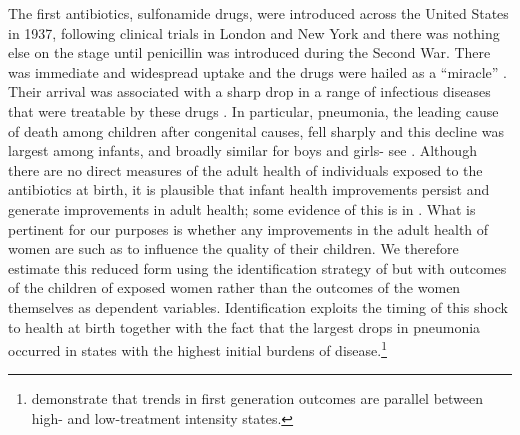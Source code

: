 \documentclass[subeqn]{article}
\begin{document}
\begin{spacing}{1.4}
The first antibiotics, sulfonamide drugs, were introduced across the United States in 1937, following clinical trials in London and New York and there was nothing else on the stage until penicillin was introduced during the Second War. There was immediate and widespread uptake and the drugs were hailed as a ``miracle'' \citep{Lesch2006}. Their arrival was associated with a sharp drop in a range of infectious diseases that were treatable by these drugs \citep{Jayachandranetal2010}. In particular, pneumonia, the leading cause of death among children after congenital causes, fell sharply and this decline was largest among infants, and broadly similar for boys and girls- see \citep{BhalotraVenkataramani2014}. Although there are no direct measures of the adult health of individuals exposed to the antibiotics at birth, it is plausible that infant health improvements persist and generate improvements in adult health; some evidence of this is in \citep{Almondetal2011b,ButikoferSalvanes2015,Hjortetal2016,Bhalotraetal2015}. What is pertinent for our purposes is whether any improvements in the adult health of women are such as to influence the quality of their children. We therefore estimate this reduced form using the identification strategy of \citep{BhalotraVenkataramani2014} but with outcomes of the children of exposed women rather than the outcomes of the women themselves as dependent variables.
Identification exploits the timing of this shock to health at birth together with the fact that the largest drops in pneumonia occurred in states with the highest initial burdens of disease.\footnote{\citet{BhalotraVenkataramani2014} demonstrate that trends in first generation outcomes are parallel between high- and low-treatment intensity states. } 
 

\end{spacing}
\end{document}
